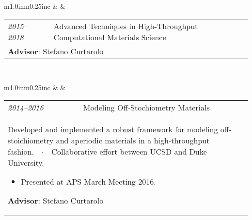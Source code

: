 \documentclass[11pt]{article}
\begin{document}
\vspace{0.5cm}

\noindent\hspace{0cm}\textcolor{black}{\textsc{}}

\vspace{0.25cm}

\begin{tabular}{m{1.0in}m{0.25in}c}
 & & 
\begin{tabular}{m{0.85in}m{0.15in}m{3.75in}}
\textit{\small{2015--2018}} & & Advanced Techniques in High-Throughput Computational Materials Science \\ \multicolumn{3}{p{4.75in}}{\footnotesize{\textbf{Advisor}: Stefano Curtarolo}} 
\end{tabular} \\ 
\end{tabular}

\vspace{0.25cm}

\begin{tabular}{m{1.0in}m{0.25in}c}
 & & 
\begin{tabular}{m{0.85in}m{0.15in}m{3.75in}}
\textit{\small{2014--2016}} & & Modeling Off-Stochiometry Materials \\ \multicolumn{3}{p{4.75in}}{\footnotesize{Developed and implemented a robust framework for modeling off-stoichiometry and aperiodic materials in a high-throughput fashion.\ \ $\cdotp$\ \ Collaborative effort between UCSD and Duke University. \noindent\begin{itemize}[leftmargin=*] \item Presented at APS March Meeting 2016. \end{itemize} \textbf{Advisor}: Stefano Curtarolo}} 
\end{tabular} \\ 
\end{tabular}

\vspace{0.25cm}
\end{document}
